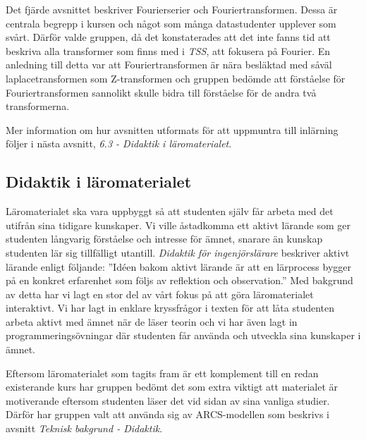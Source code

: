 \documentclass[]{article}
\begin{document}
Det fjärde avsnittet beskriver Fourierserier och
Fouriertransformen. Dessa är centrala begrepp i kursen och något som
många datastudenter upplever som svårt. Därför valde gruppen, då det
konstaterades att det inte fanns tid att beskriva alla transformer som
finns med i \textit{TSS}, att fokusera på Fourier. En anledning till
detta var att Fouriertransformen är nära besläktad med såväl
laplacetransformen som Z-transformen och gruppen bedömde att
förståelse för Fouriertransformen sannolikt skulle bidra till
förståelse för de andra två transformerna.

Mer information om hur avsnitten utformats för att uppmuntra till
inlärning följer i nästa avsnitt, \textit{6.3 - Didaktik i läromaterialet}.

\subsection{Didaktik i läromaterialet}
Läromaterialet ska vara uppbyggt så att studenten själv får arbeta med
det utifrån sina tidigare kunskaper. Vi ville åstadkomma ett aktivt
lärande som ger studenten långvarig förståelse och intresse för ämnet,
snarare än kunskap studenten lär sig tillfälligt
utantill. \textit{Didaktik för ingenjörslärare}\cite{didaktik_for_ingenjorslarare} beskriver aktivt
lärande enligt följande: ”Idéen bakom aktivt lärande är att en
lärprocess bygger på en konkret erfarenhet som följs av reflektion och
observation.” Med bakgrund av detta har vi lagt en stor del av vårt
fokus på att göra läromaterialet interaktivt. Vi har lagt in enklare
kryssfrågor i texten för att låta studenten arbeta aktivt med ämnet
när de läser teorin och vi har även lagt in programmeringsövningar där
studenten får använda och utveckla sina kunskaper i ämnet.

Eftersom läromaterialet som tagits fram är ett komplement till en
redan existerande kurs har gruppen bedömt det som extra viktigt att
materialet är motiverande eftersom studenten läser det vid sidan av
sina vanliga studier. Därför har gruppen valt att använda sig av
ARCS-modellen som beskrivs i avsnitt \textit{Teknisk bakgrund -
 Didaktik}.
\end{document}
